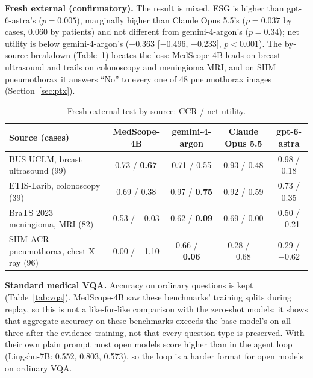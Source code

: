 \documentclass[11pt]{article}
\newcommand{\best}[1]{\textbf{#1}}
\begin{document}
\textbf{Fresh external (confirmatory).} The result is mixed. ESG is higher than gpt-6-astra's ($p=0.005$), marginally higher than Claude Opus 5.5's ($p=0.037$ by cases, $0.060$ by patients) and not different from gemini-4-argon's ($p=0.34$); net utility is below gemini-4-argon's ($-0.363$ [$-0.496$, $-0.233$], $p<0.001$). The by-source breakdown (Table~\ref{tab:ext2}) locates the loss: MedScope-4B leads on breast ultrasound and trails on colonoscopy and meningioma MRI, and on SIIM pneumothorax it answers ``No'' to every one of 48 pneumothorax images (Section~\ref{sec:ptx}).

\begin{table}[t]
\centering\footnotesize\setlength{\tabcolsep}{4pt}
\caption{Fresh external test by source: CCR / net utility.}
\label{tab:ext2}
\begin{tabular}{lcccc}
\toprule
Source (cases) & MedScope-4B & gemini-4-argon & Claude Opus 5.5 & gpt-6-astra \\
\midrule
BUS-UCLM, breast ultrasound (99) & 0.73 / \best{0.67} & 0.71 / 0.55 & 0.93 / 0.48 & 0.98 / 0.18 \\
ETIS-Larib, colonoscopy (39) & 0.69 / 0.38 & 0.97 / \best{0.75} & 0.92 / 0.59 & 0.73 / 0.35 \\
BraTS 2023 meningioma, MRI (82) & 0.53 / $-$0.03 & 0.62 / \best{0.09} & 0.69 / 0.00 & 0.50 / $-$0.21 \\
SIIM-ACR pneumothorax, chest X-ray (96) & 0.00 / $-$1.10 & 0.66 / \best{$-$0.06} & 0.28 / $-$0.68 & 0.29 / $-$0.62 \\
\bottomrule
\end{tabular}
\end{table}

\textbf{Standard medical VQA.} Accuracy on ordinary questions is kept (Table~\ref{tab:vqa}). MedScope-4B saw these benchmarks' training splits during replay, so this is not a like-for-like comparison with the zero-shot models; it shows that aggregate accuracy on these benchmarks exceeds the base model's on all three after the evidence training, not that every question type is preserved. With their own plain prompt most open models score higher than in the agent loop (Lingshu-7B: 0.552, 0.803, 0.573), so the loop is a harder format for open models on ordinary VQA.
\end{document}
